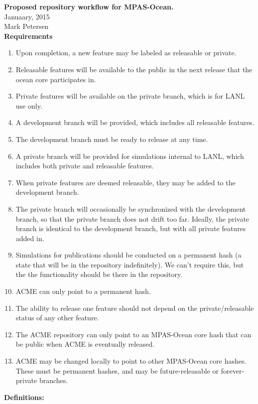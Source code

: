 \documentclass[11pt]{article}
\begin{document}
{\bf Proposed repository workflow for MPAS-Ocean.}\\
Januaary, 2015\\
Mark Petersen\\

{\bf Requirements}
\begin{enumerate}
\item Upon completion, a new feature may be labeled as releasable or private.
\item Releasable features will be available to the public in the next release that the ocean core participates in.
\item Private features will be available on the private branch, which is for LANL use only.
\item A development branch will be provided, which includes all releasable features.  
\item The development branch must be ready to release at any time.
\item A private branch will be provided for simulations internal to LANL, which includes both private and releasable features.
\item When private features are deemed releasable, they may be added to the development branch.
\item The private branch will occasionally be synchronized with the development branch, so that the private branch does not drift too far.  Ideally, the private branch is identical to the development branch, but with all private features added in.
\item Simulations for publications should be conducted on a permanent hash (a state that will be in the repository indefinitely).  We can't require this, but the the functionality should be there in the repository.
\item ACME can only point to a permanent hash.
\item The ability to release one feature should not depend on the private/releasable status of any other feature.
\item The ACME repository can only point to an MPAS-Ocean core hash that can be public when ACME is eventually released.
\item ACME may be changed locally to point to other MPAS-Ocean core hashes.  These must be permanent hashes, and may be future-releasable or forever-private branches.
\end{enumerate}

\clearpage

{\bf Definitions:}\\
\end{document}
